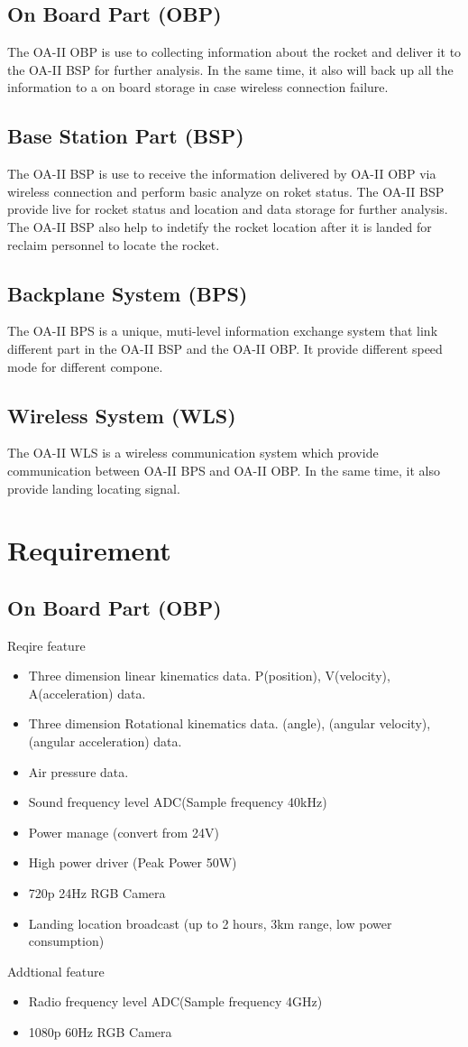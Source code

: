 \documentclass[12pt,article]{memoir}
\begin{document}
\subsection{On Board Part (OBP)}
The OA-II OBP is use to collecting information about the rocket and deliver it to the OA-II BSP for further analysis. In the same time, it also will back up all the information to a on board storage in case wireless connection failure.
\subsection{Base Station Part (BSP)}
The OA-II BSP is use to receive the information delivered by OA-II OBP via wireless connection and perform basic analyze on roket status. The OA-II BSP provide live for rocket status and location and data storage for further analysis. The OA-II BSP also help to indetify the rocket location after it is landed for reclaim personnel to locate the rocket.
\subsection{Backplane System (BPS)}
The OA-II BPS is a unique, muti-level information exchange system that link different part in the OA-II BSP and the OA-II OBP. It provide different speed mode for different compone.
\subsection{Wireless System (WLS)}
The OA-II WLS is a wireless communication system which provide communication between OA-II BPS and OA-II OBP. In the same time, it also provide landing locating signal.
\section{Requirement}
\subsection{On Board Part (OBP)}
Reqire feature
\begin{itemize}
\item Three dimension linear kinematics data. P(position), V(velocity), A(acceleration) data.
\item Three dimension Rotational kinematics data. \theta(angle), \omega(angular velocity), \alpha(angular acceleration) data.
\item Air pressure data.
\item Sound frequency level ADC(Sample frequency \geq 40kHz)
\item Power manage (convert from 24V)
\item High power driver (Peak Power \geq 50W)
\item 720p 24Hz RGB Camera 
\item Landing location broadcast (up to 2 hours, 3km range, low power consumption)
\end{itemize}
Addtional feature
\begin{itemize}
\item Radio frequency level ADC(Sample frequency \geq 4GHz)
\item 1080p 60Hz RGB Camera 
\end{itemize}
\end{document}
